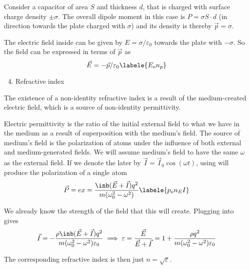 \begin{enumerate}
\hspace{.5cm}
Consider a capacitor of area $S$ and thickness $d$,
that is charged with surface charge density $\pm \sigma$.
The overall dipole moment in this case is $P = \sigma S \cdot d$
(in direction towards the plate charged with $\sigma$)
and its density is thereby $\vec{p} = \sigma$.

\hspace{.5cm}
The electric field inside can be given by $E = \sigma / \varepsilon_0$
towards the plate with $-\sigma$.
So the field can be expressed in terms of $\vec{p}$ as
\begin{equation}    
    \vec{E} = -\vec{p} / \varepsilon_0
    \labele{E_on_p}
\end{equation}

\begin{enumerate}
    \setcounter{enumii}{3}
    \item Refractive index
\end{enumerate}

\hspace{.5cm}
The existence of a non-identity refractive index is a result
of the medium-created electric field,
which is a source of non-identity permittivity.

\hspace{.5cm}
Electric permittivity is the ratio of the initial external field
to what we have in the medium as a result of superposition with the medium's field.
The source of medium's field is the polarization of atoms
under the influence of both external and medium-generated fields.
We will assume medium's field to have the same $\omega$ as the external field.
If we denote the later by $\vec{I} = \vec{I}_0 \cos(\omega t)$,
using  will produce the polarization of a single atom
\begin{equation}
    \vec{P} = ex = \frac{\inb({\vec{E} + \vec{I}}) q^2}{m (\omega_0^2 - \omega^2)}
    \labele{p_on_EI}
\end{equation}

We already know the strength of the field that this will create.
Plugging  into  gives
\begin{equation}
    \vec{I} = -\frac{\rho \inb({\vec{E} + \vec{I}}) q^2}{m (\omega_0^2 - \omega^2) \varepsilon_0}
    \implies
    \varepsilon = \frac{\vec{E}}{\vec{E} + \vec{I}} =
    1 + \frac{\rho q^2}{m (\omega_0^2 - \omega^2) \varepsilon_0}
\end{equation}

\hspace{.5cm}
The corresponding refractive index is then just $n = \sqrt{\varepsilon}$.


\end{enumerate}
